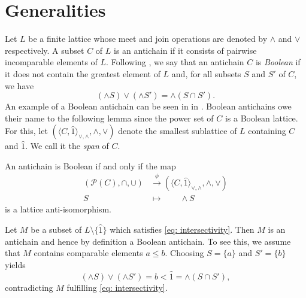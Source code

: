 \documentclass{preprint}
\theoremstyle{definition}
\begin{document}
\section{Generalities}\label{sec: Generalities}
Let $L$ be a finite lattice whose meet and join operations are denoted by $\wedge$ and $\vee$ respectively. A subset $C$ of $L$ is an antichain if it consists of pairwise incomparable elements of $L$. Following \cite{gottesman2025fractionally}, we say that an antichain $C$ is \emph{Boolean} if it does not contain the greatest element of $L$ and, for all subsets $S$ and $S'$ of $C$, we have 
%
\begin{equation}\label{eq: intersectivity}
    (\wedge S) \vee (\wedge S') = \wedge (S\cap S').
\end{equation}
An example of a Boolean antichain can be seen in  in .
%
Boolean antichains owe their name to the following lemma since the power set of $C$ is a Boolean lattice. For this, let $(\langle C, \hat{1}\rangle_{\vee, \wedge},  \wedge, \vee)$ denote the smallest sublattice of $L$ containing $C$ and $\hat{1}$. We call it the \emph{span} of $C$.
\begin{lemma}\label{lem:BoolBool}
An antichain is Boolean if and only if the map 
\begin{align*}
(\mathscr{P}(C), \cap, \cup)&\xrightarrow{\phi} (\langle C, \hat{1}\rangle_{\vee, \wedge},  \wedge, \vee)\\
S\quad\quad &\mapsto \quad\quad \wedge S
\end{align*}
is a lattice anti-isomorphism.
\end{lemma}

\begin{remark}\label{rem:Intersective is antichain}
    Let $M$ be a subset of $L\setminus\{\hat{1}\}$ which satisfies \eqref{eq: intersectivity}. Then $M$ is an antichain and hence by definition a Boolean antichain.
    To see this, we assume that $M$ contains comparable elements $a\leq b$. Choosing $S=\{a\}$ and $S'=\{b\}$ yields
    $$
    (\wedge S)\vee(\wedge S')=b < \hat{1} = \wedge (S\cap S'),
    $$
    contradicting $M$ fulfilling \eqref{eq: intersectivity}.
\end{remark}
\end{document}
